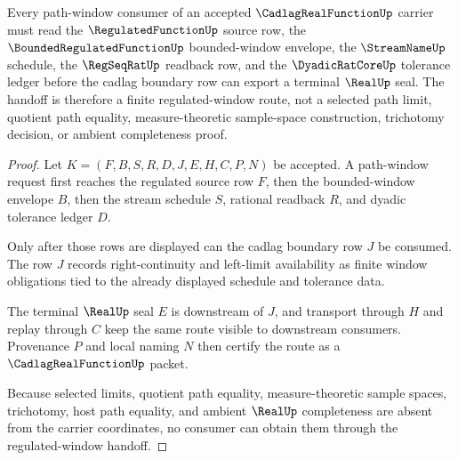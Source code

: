\begin{theorem}
\label{thm:cadlag-real-function-regulated-window-handoff}
Every path-window consumer of an accepted $\CadlagRealFunctionUp$ carrier must read the $\RegulatedFunctionUp$ source row, the $\BoundedRegulatedFunctionUp$ bounded-window envelope, the $\StreamNameUp$ schedule, the $\RegSeqRatUp$ readback row, and the $\DyadicRatCoreUp$ tolerance ledger before the cadlag boundary row can export a terminal $\RealUp$ seal. The handoff is therefore a finite regulated-window route, not a selected path limit, quotient path equality, measure-theoretic sample-space construction, trichotomy decision, or ambient completeness proof.
\end{theorem}
\begin{proof}
Let $K=(F,B,S,R,D,J,E,H,C,P,N)$ be accepted. A path-window request first reaches the regulated source row $F$, then the bounded-window envelope $B$, then the stream schedule $S$, rational readback $R$, and dyadic tolerance ledger $D$.

Only after those rows are displayed can the cadlag boundary row $J$ be consumed. The row $J$ records right-continuity and left-limit availability as finite window obligations tied to the already displayed schedule and tolerance data.

The terminal $\RealUp$ seal $E$ is downstream of $J$, and transport through $H$ and replay through $C$ keep the same route visible to downstream consumers. Provenance $P$ and local naming $N$ then certify the route as a $\CadlagRealFunctionUp$ packet.

Because selected limits, quotient path equality, measure-theoretic sample spaces, trichotomy, host path equality, and ambient $\RealUp$ completeness are absent from the carrier coordinates, no consumer can obtain them through the regulated-window handoff.
\end{proof}


